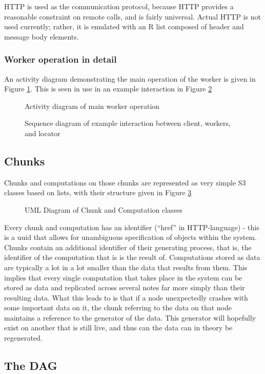 HTTP is used as the communication protocol, because HTTP provides a reasonable constraint on remote calls, and is fairly universal.
Actual HTTP is not used currently; rather, it is emulated with an R list composed of header and message body elements.

\subsubsection{Worker operation in detail}

An activity diagram demonstrating the main operation of the worker is given in Figure \ref{fig:workerops}.
This is seen in use in an example interaction in Figure \ref{fig:sysinteract}

\begin{figure}

\caption{Activity diagram of main worker operation}
\label{fig:workerops}
\end{figure}

\begin{figure}

\caption{Sequence diagram of example interaction between client, workers, and locator}
\label{fig:sysinteract}
\end{figure}


\subsection{Chunks}

Chunks and computations on those chunks are represented as very simple S3 classes based on lists, with their structure given in Figure \ref{fig:largerscale}

\begin{figure}

\caption{UML Diagram of Chunk and Computation classes}
\label{fig:largerscale}
\end{figure}

Every chunk and computation has an identifier (``href'' in HTTP-language) - this is a uuid that allows for unambiguous specification of objects within the system.
Chunks contain an additional identifier of their generating process, that is, the identifier of the computation that is is the result of.
Computations stored as data are typically a lot in a lot smaller than the data that results from them.
This implies that every single computation that takes place in the system can be stored as data and replicated across several notes far more simply than their resulting data.
What this leads to is that if a node unexpectedly crashes with some important data on it, the chunk referring to the data on that node maintains a reference to the generator of the data.
This generator will hopefully exist on another that is still live, and thus can the data can in theory be regenerated.

\subsection{The DAG}
